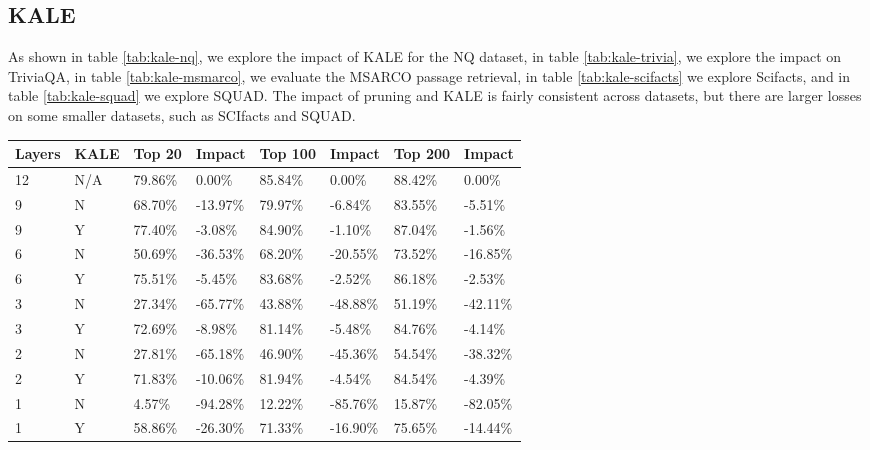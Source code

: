 \subsection{KALE}
\label{sec:KALE-full}
As shown in table \ref{tab:kale-nq}, we explore the impact of KALE for the NQ dataset, in table \ref{tab:kale-trivia}, we explore the impact on TriviaQA, in table \ref{tab:kale-msmarco}, we evaluate the MSARCO passage retrieval, in table \ref{tab:kale-scifacts} we explore Scifacts, and in table \ref{tab:kale-squad} we explore SQUAD. The impact of pruning and KALE is fairly consistent across datasets, but there are larger losses on some smaller datasets, such as SCIfacts and SQUAD. 
\begin{table*}[!ht]
    \centering
    \begin{tabular}{|l|l|l|l|l|l|l|l|}
    \hline
        Layers & KALE & Top 20 & Impact & Top 100 & Impact & Top 200 & Impact \\ \hline
        12 & N/A & 79.86\% & 0.00\% & 85.84\% & 0.00\% & 88.42\% & 0.00\% \\ \hline
        9 & N & 68.70\% & -13.97\% & 79.97\% & -6.84\% & 83.55\% & -5.51\% \\ \hline
        9 & Y & 77.40\% & -3.08\% & 84.90\% & -1.10\% & 87.04\% & -1.56\% \\ \hline
        6 & N & 50.69\% & -36.53\% & 68.20\% & -20.55\% & 73.52\% & -16.85\% \\ \hline
        6 & Y & 75.51\% & -5.45\% & 83.68\% & -2.52\% & 86.18\% & -2.53\% \\ \hline
        3 & N & 27.34\% & -65.77\% & 43.88\% & -48.88\% & 51.19\% & -42.11\% \\ \hline
        3 & Y & 72.69\% & -8.98\% & 81.14\% & -5.48\% & 84.76\% & -4.14\% \\ \hline
        2 & N & 27.81\% & -65.18\% & 46.90\% & -45.36\% & 54.54\% & -38.32\% \\ \hline
        2 & Y & 71.83\% & -10.06\% & 81.94\% & -4.54\% & 84.54\% & -4.39\% \\ \hline
        1 & N & 4.57\% & -94.28\% & 12.22\% & -85.76\% & 15.87\% & -82.05\% \\ \hline
        1 & Y & 58.86\% & -26.30\% & 71.33\% & -16.90\% & 75.65\% & -14.44\% \\ \hline
    \end{tabular}
    \caption{Impact of structural pruning with and without KALE on the NQ retrieval dataset}
    \label{tab:kale-nq}
\end{table*}

